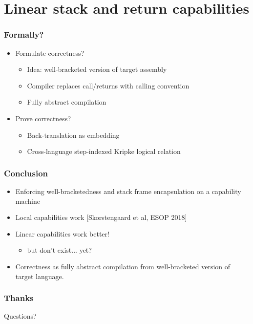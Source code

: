 \documentclass{beamer}
\begin{document}
\section{Linear stack and return capabilities}


\begin{frame}
  \frametitle{Formally?}

  \begin{itemize}
  \item<2-> Formulate correctness?
    \begin{itemize}
    \item<3-> Idea: well-bracketed version of target assembly
    \item<3-> Compiler replaces call/returns with calling convention
    \item<3-> Fully abstract compilation
    \end{itemize}
  \item Prove correctness?
    \begin{itemize}
    \item<4-> Back-translation as embedding
    \item<4-> Cross-language step-indexed Kripke logical relation
    \end{itemize}
  \end{itemize}
\end{frame}

\begin{frame}
  \frametitle{Conclusion}
  \begin{itemize}
  \item Enforcing well-bracketedness and stack frame encapsulation on a capability machine
  \item Local capabilities work [Skorstengaard et al, ESOP 2018]
  \item Linear capabilities work better!
    \begin{itemize}
    \item but don't exist... yet?
    \end{itemize}
  \item Correctness as fully abstract compilation from well-bracketed version of target language.
  \end{itemize}
\end{frame}

\begin{frame}
  \frametitle{Thanks}
  \begin{center}
    \Large Questions?
  \end{center}
\end{frame}
\end{document}
